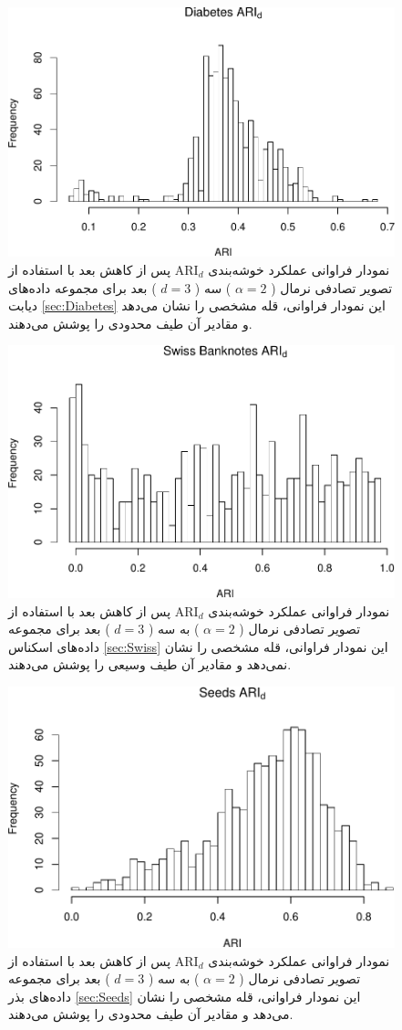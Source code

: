 \begin{figure}[H]
\centering
\includegraphics[width=0.7\linewidth]{Report_files/figure-latex/unnamed-chunk-6-3}
\caption{
نمودار فراوانی عملکرد خوشه‌بندی 
$\mathrm{ARI}_d$
پس از کاهش بعد با استفاده از تصویر تصادفی
نرمال (%
$\alpha=2$%
)
سه (%
$d=3$%
)
بعد برای مجموعه داده‌های
دیابت
\ref{sec:Diabetes}
این نمودار فراوانی،
قله
مشخصی را نشان 
می‌دهد
و مقادیر آن طیف 
محدودی
 را پوشش می‌دهند.
}
\end{figure}


\begin{figure}[H]
\centering
\includegraphics[width=0.7\linewidth]{Report_files/figure-latex/unnamed-chunk-6-4}
\caption{
نمودار فراوانی عملکرد خوشه‌بندی 
$\mathrm{ARI}_d$
پس از کاهش بعد با استفاده از تصویر تصادفی
نرمال (%
$\alpha=2$%
)
به
سه (%
$d=3$%
)
بعد برای مجموعه داده‌های
اسکناس
\ref{sec:Swiss}
این نمودار فراوانی،
قله
مشخصی را نشان 
نمی‌دهد
و مقادیر آن طیف 
وسیعی را پوشش می‌دهند.
}
\end{figure}


\begin{figure}[H]
\centering
\includegraphics[width=0.7\linewidth]{Report_files/figure-latex/unnamed-chunk-6-5}
\caption{
نمودار فراوانی عملکرد خوشه‌بندی 
$\mathrm{ARI}_d$
پس از کاهش بعد با استفاده از تصویر تصادفی
نرمال (%
$\alpha=2$%
)
به سه (%
$d=3$%
)
بعد برای مجموعه داده‌های
بذر
\ref{sec:Seeds}
این نمودار فراوانی،
قله
مشخصی را نشان 
می‌دهد
و مقادیر آن طیف 
محدودی
را پوشش می‌دهند.
}
\end{figure}


